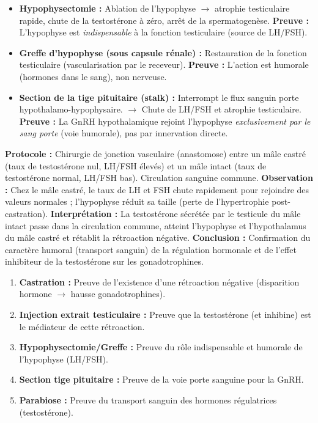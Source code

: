 \documentclass[11pt]{article}
\newcommand{\cle}[1]{{\popxbold\color{popdark}#1}}
\begin{document}
\begin{experience}
\begin{itemize}
    \item \textbf{Hypophysectomie :} Ablation de l'hypophyse $\rightarrow$ atrophie testiculaire rapide, chute de la testostérone à zéro, arrêt de la spermatogenèse. \textbf{Preuve :} L'hypophyse est \emph{indispensable} à la fonction testiculaire (source de LH/FSH).
    \item \textbf{Greffe d'hypophyse (sous capsule rénale) :} Restauration de la fonction testiculaire (vascularisation par le receveur). \textbf{Preuve :} L'action est humorale (hormones dans le sang), non nerveuse.
    \item \textbf{Section de la tige pituitaire (stalk) :} Interrompt le flux sanguin porte hypothalamo-hypophysaire. $\rightarrow$ Chute de LH/FSH et atrophie testiculaire. \textbf{Preuve :} La GnRH hypothalamique rejoint l'hypophyse \emph{exclusivement par le sang porte} (voie humorale), pas par innervation directe.
\end{itemize}
\end{experience}

\begin{experience}
\textbf{Protocole :} Chirurgie de jonction vasculaire (anastomose) entre un mâle castré (taux de testostérone nul, LH/FSH élevés) et un mâle intact (taux de testostérone normal, LH/FSH bas). Circulation sanguine commune.
\textbf{Observation :} Chez le mâle castré, le taux de LH et FSH chute rapidement pour rejoindre des valeurs normales ; l'hypophyse réduit sa taille (perte de l'hypertrophie post-castration).
\textbf{Interprétation :} La testostérone sécrétée par le testicule du mâle intact passe dans la circulation commune, atteint l'hypophyse et l'hypothalamus du mâle castré et rétablit la rétroaction négative.
\textbf{Conclusion :} Confirmation du caractère \cle{humoral} (transport sanguin) de la régulation hormonale et de l'effet inhibiteur de la testostérone sur les gonadotrophines.
\end{experience}

\begin{aretenir}
\begin{enumerate}
    \item \textbf{Castration :} Preuve de l'existence d'une rétroaction négative (disparition hormone $\rightarrow$ hausse gonadotrophines).
    \item \textbf{Injection extrait testiculaire :} Preuve que la testostérone (et inhibine) est le médiateur de cette rétroaction.
    \item \textbf{Hypophysectomie/Greffe :} Preuve du rôle indispensable et humorale de l'hypophyse (LH/FSH).
    \item \textbf{Section tige pituitaire :} Preuve de la voie porte sanguine pour la GnRH.
    \item \textbf{Parabiose :} Preuve du transport sanguin des hormones régulatrices (testostérone).
\end{enumerate}
\end{aretenir}
\end{document}
